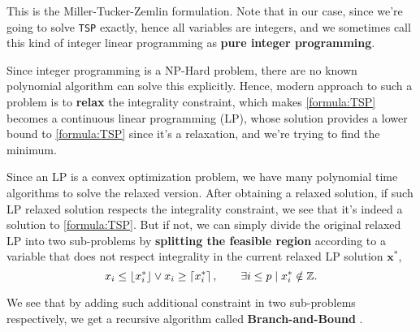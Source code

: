 \documentclass{article}
\begin{document}
This is the Miller-Tucker-Zemlin formulation\cite{MTZ-formulation}. Note that in our case, since we're going to solve \texttt{TSP} exactly, hence all variables are integers,
and we sometimes call this kind of integer linear programming as \textbf{pure integer programming}.

Since integer programming is a NP-Hard problem, there are no known polynomial algorithm can solve this explicitly. Hence, modern approach to such a problem is to
\textbf{relax} the integrality constraint, which makes \autoref{formula:TSP} becomes a continuous linear programming (LP), whose solution provides a lower bound to
\autoref{formula:TSP} since it's a relaxation, and we're trying to find the minimum.

Since an LP is a convex optimization problem, we have many polynomial time algorithms to solve the relaxed version. After obtaining a relaxed solution, if such LP relaxed
solution respects the integrality constraint, we see that it's indeed a solution to \autoref{formula:TSP}. But if not, we can simply divide the original relaxed LP into two
sub-problems by \textbf{splitting the feasible region} according to a variable that does not respect integrality in the current relaxed LP solution \(\bm{x}^\ast\),
\begin{equation}\label{eq:branch-and-bound}
	x_{i} \leq \left\lfloor x_{i}^\ast \right\rfloor\lor x_{i} \geq \left\lceil x_{i}^\ast \right\rceil,\qquad \exists i\leq p\mid x_{i} ^\ast \notin \mathbb{\MakeUppercase{z}}.
\end{equation}

We see that by adding such additional constraint in two sub-problems respectively, we get a recursive algorithm called \textbf{Branch-and-Bound} \cite{B&B.ch7}.
\end{document}
